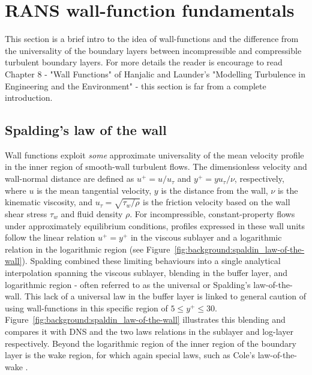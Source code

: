 \section{RANS wall-function fundamentals}
\label{sec:background:rans-wall-function-fundamentals}

This section is a brief intro to the idea of wall-functions and the difference from the universality of the boundary layers between incompressible and compressible turbulent boundary layers. For more details the reader is encourage to read Chapter 8 - "Wall Functions" of Hanjalic and Launder's "Modelling Turbulence in Engineering and the Environment" \cite{hanjalic2022modelling} - this section is far from a complete introduction.

\subsection{Spalding's law of the wall}
\label{subsec:background:spalding}

Wall functions exploit \textit{some} approximate universality of the mean velocity profile in the inner region of smooth-wall turbulent flows. The dimensionless velocity and wall-normal distance are defined as \(u^+=u/u_\tau\) and \(y^+=yu_\tau/\nu\), respectively, where \(u\) is the mean tangential velocity, \(y\) is the distance from the wall, \(\nu\) is the kinematic viscosity, and \(u_\tau=\sqrt{\tau_w/\rho}\) is the friction velocity based on the wall shear stress \(\tau_w\) and fluid density \(\rho\). For incompressible, constant-property flows under approximately equilibrium conditions, profiles expressed in these wall units follow the linear relation \(u^+=y^+\) in the viscous sublayer and a logarithmic relation in the logarithmic region (see Figure~\ref{fig:background:spaldin_law-of-the-wall}). Spalding \cite{spalding1961single} combined these limiting behaviours into a single analytical interpolation spanning the viscous sublayer, blending in the buffer layer, and logarithmic region - often referred to as the universal or Spalding's law-of-the-wall. This lack of a universal law in the buffer layer is linked to general caution of using wall-functions in this specific region of \(5 \le y^+ \le 30\). Figure~\ref{fig:background:spaldin_law-of-the-wall} illustrates this blending and compares it with DNS and the two laws relations in the sublayer and log-layer respectively. Beyond the logarithmic region of the inner region of the boundary layer is the wake region, for which again special laws, such as Cole's law-of-the-wake \cite{coles1956law}. 

